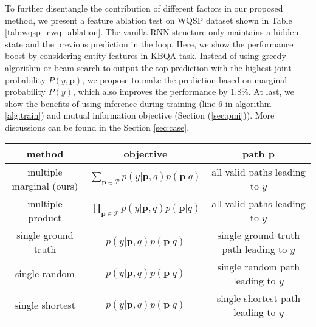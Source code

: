 To further disentangle the contribution of different factors in our proposed method, we present a feature ablation test on WQSP dataset shown in Table \ref{tab:wqsp_cwq_ablation}. The vanilla RNN structure only maintains a hidden state and the previous prediction in the loop. Here, we show the performance boost by considering entity features in KBQA task. Instead of using greedy algorithm or beam search to output the top prediction with the highest joint probability $P(y,\mathbf{p})$, we propose to make the prediction based on marginal probability $P(y)$, which also improves the performance by $1.8\%$. At last, we show the benefits of using inference during training (line 6 in algorithm \ref{alg:train}) and mutual information objective (Section (\ref{sec:pmi})). More discussions can be found in the Section \ref{sec:case}. 

\begin{table*}[t]
  \centering
  \begin{tabular}{|c|c|c|}
  \hline
  method & objective & path $\mathbf{p}$ \\
  \hline
     multiple marginal (ours)& $\sum_{\mathbf{p}\in\mathcal{P}} p(y|\mathbf{p},q)p(\mathbf{p}|q)$ & all valid paths leading to $y$\\
     \hline
        multiple product& $\prod_{\mathbf{p}\in\mathcal{P}} p(y|\mathbf{p},q)p(\mathbf{p}|q)$ & all valid paths leading to $y$\\
        \hline
     single ground truth& $ p(y|\mathbf{p},q)p(\mathbf{p}|q)$ & single ground truth path leading to $y$\\
    \hline
    single random& $ p(y|\mathbf{p},q)p(\mathbf{p}|q)$ & single random path leading to $y$\\
    \hline
    single shortest& $ p(y|\mathbf{p},q)p(\mathbf{p}|q)$ & single shortest path leading to $y$\\
     \hline
  \end{tabular}
  \caption{} 
  \label{tab:obj_fcn}
\end{table*}



